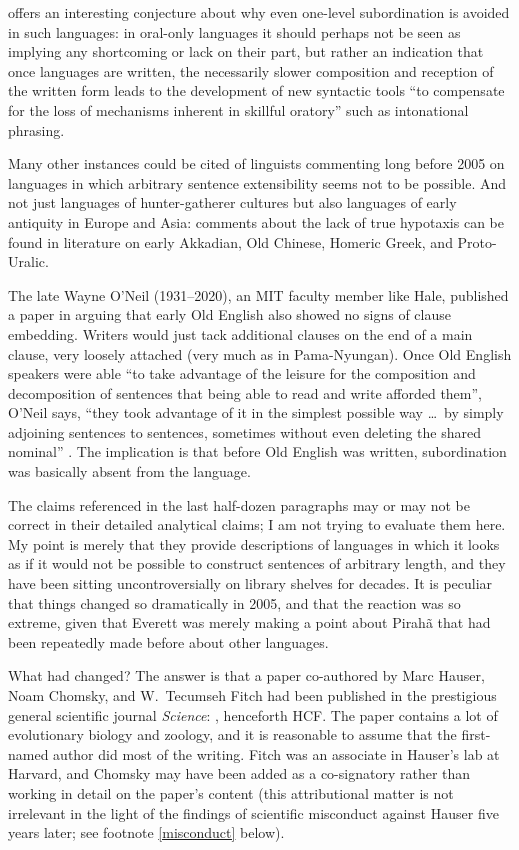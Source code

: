 \documentclass[output=paper,colorlinks,citecolor=brown
]{langscibook}
\begin{document}
\citet[509]{Mithun84} offers an interesting conjecture
about why even one-level subordination is avoided in such languages:
in oral-only languages it should perhaps not be seen as implying any
shortcoming or lack on their part, but rather an indication that once
languages are written, the necessarily slower composition and reception
of the written form leads to the development of new syntactic tools
``to compensate for the loss of mechanisms inherent in skillful oratory''
such as intonational phrasing.

Many other instances could be cited of linguists commenting long before
2005 on languages in which arbitrary sentence extensibility seems not
to be possible. And not just languages of hunter-gatherer cultures
but also languages of early antiquity in Europe and Asia: comments
about the lack of true hypotaxis can be found in literature on
early Akkadian, Old Chinese, Homeric Greek, and Proto-Uralic.

The late Wayne O'Neil (1931--2020), an MIT faculty member like Hale,
published a paper in \citeyear{ONeil77} arguing that early Old English
also showed no signs of clause embedding. Writers would just tack additional clauses on the end of a main clause, very loosely attached
(very much as in Pama-Nyungan). Once Old English speakers were able
``to take advantage of the leisure for the composition and decomposition
of sentences that being able to read and write afforded them'', O'Neil
says, ``they took advantage of it in the simplest possible way \ldots\
by simply adjoining sentences to sentences, sometimes without even
deleting the shared nominal'' \citeyearpar[210]{ONeil77}. The implication
is that before Old English was written, subordination was basically
absent from the language.\label{page-non-infinite-languages-end}

The claims referenced in the last half-dozen paragraphs may or may not
be correct in their detailed analytical claims; I am not trying to
evaluate them here. My point is merely that they provide descriptions
of languages in which it looks as if it would not be possible to
construct sentences of arbitrary length, and they have been sitting
uncontroversially on library shelves for decades. It is peculiar that
things changed so dramatically in 2005, and that the reaction was so
extreme, given that Everett was merely making a point about Pirahã
that had been repeatedly made before about other languages.

What had changed? The answer is that a paper co-authored by Marc
Hauser, Noam Chomsky, and W.\ Tecumseh Fitch had been published in
the prestigious general scientific journal \textit{Science}: , henceforth HCF. The paper contains
a lot of evolutionary biology and zoology, and it is reasonable to
assume that the first-named author did most of the writing. Fitch was
an associate in Hauser's lab at Harvard, and Chomsky may have been
added as a co-signatory rather than working in detail on the paper's
content (this attributional matter is not irrelevant in the light of
the findings of scientific misconduct against Hauser five years later;
see footnote \ref{misconduct} below).
\end{document}
